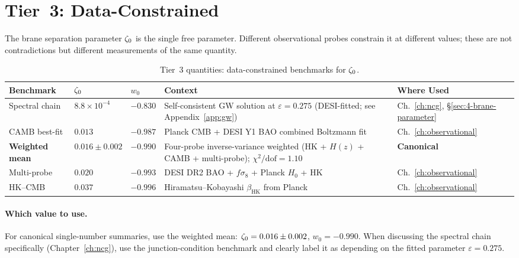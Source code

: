 \section{Tier~3: Data-Constrained}
\label{app:val-tier3}

The brane separation parameter $\zeta_0$ is the single free parameter. Different observational probes constrain it at different values; these are not contradictions but different measurements of the same quantity.

\begin{table}[h!]
\caption{Tier~3 quantities: data-constrained benchmarks for $\zeta_0$.}
\label{tab:val-tier3}
\small
\renewcommand{\arraystretch}{1.25}
\begin{tabular}{@{}p{3.5cm}p{2.2cm}p{1.8cm}p{4.5cm}p{2.5cm}@{}}
\toprule
\textbf{Benchmark} & \textbf{$\zeta_0$} & \textbf{$w_0$} & \textbf{Context} & \textbf{Where Used} \\
\midrule

Spectral chain &
$8.8 \times 10^{-4}$ &
$-0.830$ &
Self-consistent GW solution at $\varepsilon = 0.275$ (DESI-fitted; see Appendix~\ref{app:gw}) &
Ch.~\ref{ch:ncg}, \S\ref{sec:4-brane-parameter} \\

CAMB best-fit &
$0.013$ &
$-0.987$ &
Planck CMB + DESI Y1 BAO combined Boltzmann fit &
Ch.~\ref{ch:observational} \\

\textbf{Weighted mean} &
$\mathbf{0.016 \pm 0.002}$ &
$\mathbf{-0.990}$ &
Four-probe inverse-variance weighted (HK + $H(z)$ + CAMB + multi-probe); $\chi^2/\mathrm{dof} = 1.10$ &
\textbf{Canonical} \\

Multi-probe &
$0.020$ &
$-0.993$ &
DESI DR2 BAO + $f\sigma_8$ + Planck $H_0$ + HK &
Ch.~\ref{ch:observational} \\

HK--CMB &
$0.037$ &
$-0.996$ &
Hiramatsu--Kobayashi $\beta_\mathrm{HK}$ from Planck &
Ch.~\ref{ch:observational} \\

\bottomrule
\end{tabular}
\end{table}

\paragraph{Which value to use.}
For canonical single-number summaries, use the weighted mean: $\zeta_0 = 0.016 \pm 0.002$, $w_0 = -0.990$. When discussing the spectral chain specifically (Chapter~\ref{ch:ncg}), use the junction-condition benchmark and clearly label it as depending on the fitted parameter $\varepsilon = 0.275$.

